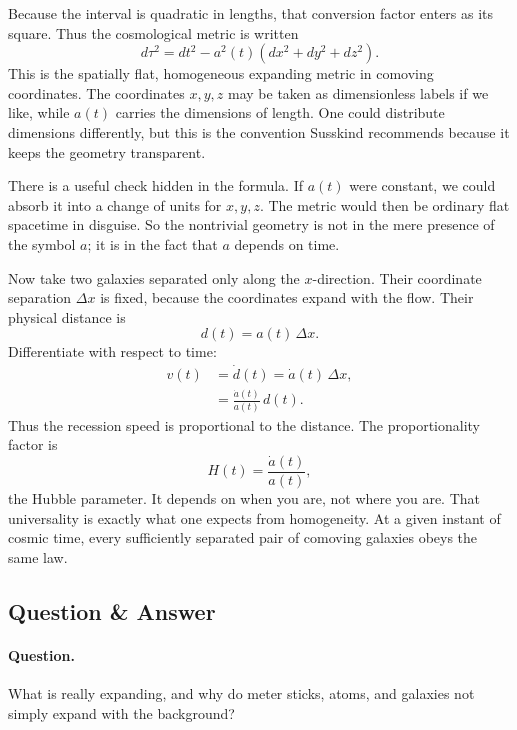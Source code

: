 Because the interval is quadratic in lengths, that conversion factor enters as its square. Thus the cosmological metric is written
\begin{equation}
d\tau^2 = dt^2 - a^2(t)\left(dx^2+dy^2+dz^2\right).
\end{equation}
This is the spatially flat, homogeneous expanding metric in comoving coordinates. The coordinates \(x,y,z\) may be taken as dimensionless labels if we like, while \(a(t)\) carries the dimensions of length. One could distribute dimensions differently, but this is the convention Susskind recommends because it keeps the geometry transparent.

There is a useful check hidden in the formula. If \(a(t)\) were constant, we could absorb it into a change of units for \(x,y,z\). The metric would then be ordinary flat spacetime in disguise. So the nontrivial geometry is not in the mere presence of the symbol \(a\); it is in the fact that \(a\) depends on time.

Now take two galaxies separated only along the \(x\)-direction. Their coordinate separation \(\Delta x\) is fixed, because the coordinates expand with the flow. Their physical distance is
\begin{equation}
d(t)=a(t)\,\Delta x.
\end{equation}
Differentiate with respect to time:
\begin{align}
v(t) &= \dot d(t)=\dot a(t)\,\Delta x, \\
     &= \frac{\dot a(t)}{a(t)}\,d(t).
\end{align}
Thus the recession speed is proportional to the distance. The proportionality factor is
\begin{equation}
H(t)=\frac{\dot a(t)}{a(t)},
\end{equation}
the Hubble parameter. It depends on when you are, not where you are. That universality is exactly what one expects from homogeneity. At a given instant of cosmic time, every sufficiently separated pair of comoving galaxies obeys the same law.

\subsection{Question \& Answer}

\paragraph{Question.} What is really expanding, and why do meter sticks, atoms, and galaxies not simply expand with the background?

